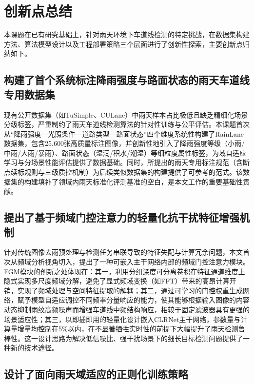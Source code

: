 \section{创新点总结}
\label{sec:innovation}

本课题在已有研究基础上，针对雨天环境下车道线检测的特定挑战，在数据集构建方法、算法模型设计以及工程部署策略三个层面进行了创新性探索，主要创新点归纳如下。

\subsection{构建了首个系统标注降雨强度与路面状态的雨天车道线专用数据集}

现有公开数据集（如TuSimple、CULane）中雨天样本占比极低且缺乏精细化场景分级标签，严重制约了雨天车道线检测算法的针对性训练与公平评估。本课题首次从“降雨强度—光照条件—道路类型—路面状态”四个维度系统性构建了RainLane数据集，包含25,600张高质量标注图像，并创新性地引入了降雨强度等级（小雨/中雨/大雨/暴雨）、路面状态（湿润/积水/潮湿）等细粒度属性标签，为域自适应学习与分场景性能评估提供了数据基础。同时，所提出的雨天专用标注规范（含断点续标规则与三级质控机制）为后续类似数据集的构建提供了可参考的范式。该数据集的构建填补了领域内雨天标准化评测基准的空白，是本文工作的重要基础性贡献。

\subsection{提出了基于频域门控注意力的轻量化抗干扰特征增强机制}

针对传统图像去雨预处理与检测任务串联导致的特征失配与计算冗余问题，本文首次从频域分析视角切入，提出了一种可嵌入主干网络内部的频域门控注意力模块。FGM模块的创新之处体现在：其一，利用分组深度可分离卷积在特征通道维度上隐式实现多尺度频域分解，避免了显式频域变换（如FFT）带来的高昂计算开销，实现了频域处理与空间特征提取的解耦；其二，通过可学习的门控权重生成网络，赋予模型自适应调控不同频率分量响应的能力，使其能够根据输入图像的内容动态抑制雨纹高频噪声而增强车道线中频结构响应，相较于固定滤波器具有更强的场景适应性；其三，以即插即用的轻量化设计嵌入CLRNet主干网络，参数量与计算量增量均控制在5\%以内，在不显著牺牲实时性的前提下大幅提升了雨天检测鲁棒性。这一设计思路为解决低信噪比、强干扰场景下的细长目标检测问题提供了一种新的技术途径。

\subsection{设计了面向雨天域适应的正则化训练策略}

